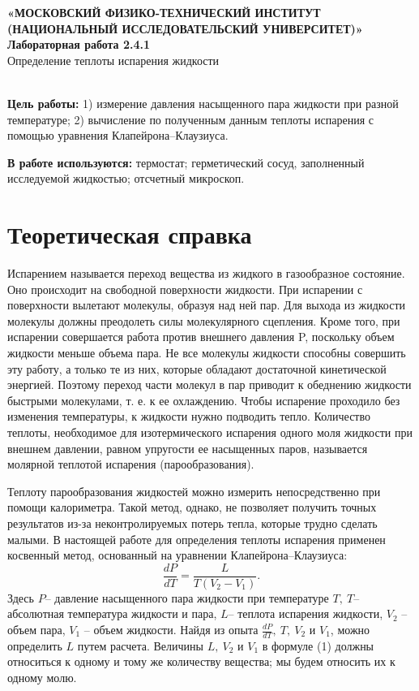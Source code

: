 \documentclass[a4paper,12pt]{article} %
\theoremstyle{plain} %
\theoremstyle{definition} %
\theoremstyle{remark} %
\begin{document}
 
\begin{center}
\hfill \break

\small{\textbf{«МОСКОВСКИЙ ФИЗИКО-ТЕХНИЧЕСКИЙ ИНСТИТУТ (НАЦИОНАЛЬНЫЙ ИССЛЕДОВАТЕЛЬСКИЙ УНИВЕРСИТЕТ)»}}\\
\hfill \break
\hfill \break
\Large\textbf{{Лабораторная работа 2.4.1}}\\
\Large{Определение теплоты испарения жидкости}\\

\\
\end{center}

\vspace{2cm}

\noindent\textbf{Цель работы:} 1) измерение давления насыщенного пара жидкости при разной температуре; 2) вычисление по полученным данным теплоты испарения с помощью уравнения Клапейрона–Клаузиуса.

\noindent\textbf{В работе используются:} термостат; герметический сосуд, заполненный исследуемой жидкостью; отсчетный микроскоп.

\section*{Теоретическая справка}
Испарением называется переход вещества из жидкого в газообразное состояние. Оно происходит на свободной поверхности жидкости.
При испарении с поверхности вылетают молекулы, образуя над ней пар. Для выхода из жидкости молекулы должны преодолеть силы молекулярного сцепления. Кроме того, при испарении совершается работа против внешнего давления P, поскольку объем жидкости меньше объема пара. Не все молекулы жидкости способны совершить эту работу, а только те из них, которые обладают достаточной кинетической энергией. Поэтому переход части молекул в пар приводит
к обеднению жидкости быстрыми молекулами, т. е. к ее охлаждению. Чтобы испарение проходило без изменения температуры,
к жидкости нужно подводить тепло. Количество теплоты, необходимое для изотермического испарения одного моля жидкости при внешнем давлении, равном упругости ее насыщенных паров, называется молярной теплотой испарения (парообразования).

Теплоту парообразования жидкостей можно измерить непосредственно при помощи
калориметра. Такой метод, однако, не позволяет получить точных результатов из-за неконтролируемых потерь тепла,
которые трудно сделать малыми. В настоящей работе для определения теплоты испарения применен
косвенный метод, основанный на уравнении Клапейрона–Клаузиуса:
\begin{equation}
\dfrac{dP}{dT}=\dfrac{L}{T(V_2-V_1)}.
\end{equation}
Здесь $P$-- давление насыщенного пара жидкости при температуре $T, ~T$-- абсолютная температура жидкости и пара,
$L$-- теплота испарения жидкости,
$V_2$ -- объем пара,
$V_1$ -- объем жидкости. Найдя из
опыта $\frac{dP}{dT},~T,~ V_2$ и
$V_1$, можно определить $L$ путем расчета. Величины $L,~ V_2$ и
$V_1$ в формуле (1) должны относиться к одному и тому же количеству вещества; мы будем относить их
к одному молю.
\end{document}
